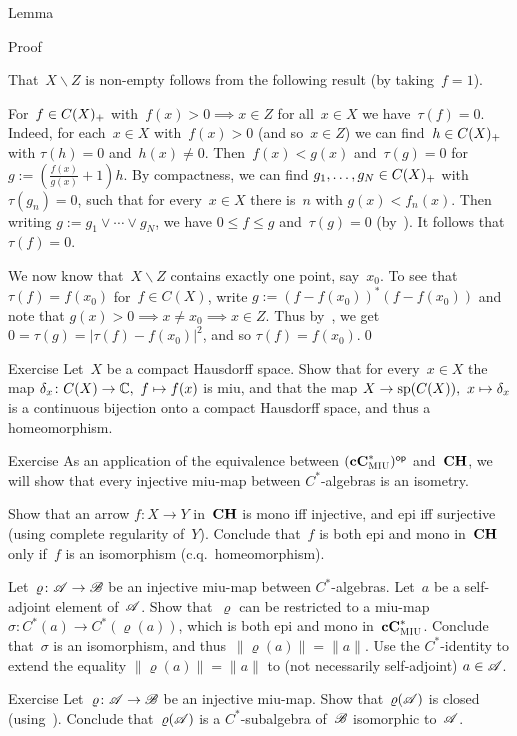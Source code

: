 \documentclass[main]{subfiles}
\begin{document}
\begin{parsec}
\begin{point}{Lemma}
\begin{point}{Proof}
\begin{point}
That~$X\backslash Z$ is non-empty
follows from the following result (by taking~$f=1$).
\end{point}
\begin{point}%
For~$f\in C(X)_{+}$
with~$f(x)> 0 \implies x\in Z$ for all~$x\in X$
we have~$\tau(f)=0$.
Indeed, for each~$x\in X$ with~$f(x)>0$
(and so~$x\in Z$)
we can find~$h\in C(X)_{+}$
with $\tau(h)=0$ and~$h(x)\neq 0$.
Then~$f(x)< g(x)$
and~$\tau(g)=0$
for $g:=(\frac{f(x)}{g(x)}+1)h$.
By compactness,
we can find $g_1,\dotsc,g_N\in C(X)_{+}$
with~$\tau(g_n)=0$,
such that for every~$x\in X$
there is~$n$ with $g(x)<f_n(x)$.
Then writing $g:=g_1\vee \dotsb \vee g_N$,
we have $0\leq f\leq g$ and~$\tau(g)=0$
(by~).
It follows that~$\tau(f)=0$.
\end{point}
\begin{point}%
We now know that~$X\backslash Z$ contains exactly
one point, say~$x_0$.
To see that~$\tau(f)=f(x_0)$
for~$f\in C(X)$,
write $g:=(f-f(x_0))^*(f-f(x_0))$
and note that $g(x)>0\implies x\neq x_0\implies  x\in Z$.
Thus by~,
we get $0=\tau(g)=\left|\tau(f)-f(x_0)\right|^2$,
and so $\tau(f)=f(x_0)$.\qed
\end{point}
\end{point}
\begin{point}{Exercise}%
Let~$X$ be a compact Hausdorff space.
Show that for every~$x\in X$
the map $\delta_x\colon C(X)\to \mathbb{C},\ f\mapsto f(x)$
is miu,
and that the map $X\to \mathrm{sp}(C(X)),\ x\mapsto \delta_x$
is a continuous bijection
onto a compact Hausdorff space,
and thus a homeomorphism.
\end{point}
\end{point}
\begin{point}{Exercise}%
As an application of the equivalence
between ${(\mathbf{cC}^*_{\text{\textsc{MIU}}})}{^{\mathsf{op}}}$
and~$\mathbf{CH}$,
we will show that every injective miu-map
between $C^*$-algebras
is an isometry.

Show that an arrow $f\colon X\to Y$
in~$\mathbf{CH}$ is mono iff injective, and epi iff surjective
(using complete regularity of~$Y$).
Conclude that~$f$ is both epi and mono in~$\mathbf{CH}$
only if~$f$ is an isomorphism (c.q.~homeomorphism).

Let~$\varrho\colon \mathscr{A}\to\mathscr{B}$
be an injective miu-map between $C^*$-algebras.
Let~$a$ be a self-adjoint element of~$\mathscr{A}$.
Show that~$\varrho$ can be restricted
to a miu-map $\sigma\colon C^*(a)\to C^*(\varrho(a))$,
which is both epi and mono in~$\mathbf{cC}^*_{\text{\textsc{MIU}}}$.
Conclude that~$\sigma$ is an isomorphism,
and thus~$\|\varrho(a)\|=\|a\|$.
Use the $C^*$-identity
to extend the equality $\|\varrho(a)\|=\|a\|$ 
to (not necessarily self-adjoint) $a\in \mathscr{A}$.
\end{point}
\begin{point}{Exercise}%
Let~$\varrho\colon \mathscr{A}\to\mathscr{B}$ 
be an injective miu-map.
Show that~$\varrho(\mathscr{A})$
is closed (using~).
Conclude that~$\varrho(\mathscr{A})$
is a
 $C^*$-subalgebra of~$\mathscr{B}$
isomorphic to~$\mathscr{A}$.
\end{point}
\end{parsec}
\end{document}
